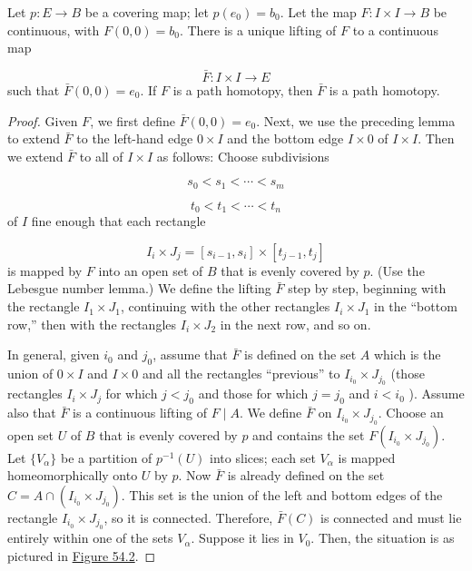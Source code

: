 \begin{lemma}
\label{lem:\thetheorem}
Let \(p : E \rightarrow B\) be a covering map; let \(p( e_{0}) = b_{0}\). Let the map \(F : I \times I \rightarrow B\) be continuous, with \(F( {0,0}) = b_{0}\). There is a unique lifting of \(F\) to a continuous map

\[
\bar{F} : I \times I \rightarrow E
\]
such that \(\bar{F}( {0,0}) = e_{0}\). If \(F\) is a path homotopy, then \(\bar{F}\) is a path homotopy.
\end{lemma}

\begin{proof}
Given \(F\), we first define \(\bar{F}( {0,0}) = e_{0}\). Next, we use the preceding lemma to extend \(\bar{F}\) to the left-hand edge \(0 \times I\) and the bottom edge \(I \times 0\) of \(I \times I\). Then we extend \(\bar{F}\) to all of \(I \times I\) as follows:
Choose subdivisions

\[
s_{0} < s_{1} < \cdots < s_{m}
\]

\[
t_{0} < t_{1} < \cdots < t_{n}
\]
of \(I\) fine enough that each rectangle

\[
I_{i} \times {J}_{j} = [ {s_{i - 1},s_{i}}] \times [ {t_{j - 1},t_{j}}]
\]
is mapped by \(F\) into an open set of \(B\) that is evenly covered by \(p\). (Use the Lebesgue number lemma.) We define the lifting \(\bar{F}\) step by step, beginning with the rectangle \(I_{1} \times {J}_{1}\), continuing with the other rectangles \(I_{i} \times {J}_{1}\) in the ``bottom row,'' then with the rectangles \(I_{i} \times {J}_{2}\) in the next row, and so on.

In general, given \(i_{0}\) and \(j_{0}\), assume that \(\bar{F}\) is defined on the set \(A\) which is the union of \(0 \times I\) and \(I \times 0\) and all the rectangles ``previous'' to \(I_{i_{0}} \times {J}_{j_{0}}\) (those rectangles \(I_{i} \times {J}_{j}\) for which \(j < j_{0}\) and those for which \(j = j_{0}\) and \(i < i_{0}\) ). Assume also that \(\bar{F}\) is a continuous lifting of \(F \mid A\). We define \(\bar{F}\) on \(I_{i_{0}} \times {J}_{j_{0}}\). Choose an open set \(U\) of \(B\) that is evenly covered by \(p\) and contains the set \(F( {I_{i_{0}} \times {J}_{j_{0}}})\). Let \(\{ V_{\alpha }\}\) be a partition of \(p^{-1}( U)\) into slices; each set \(V_{\alpha }\) is mapped homeomorphically onto \(U\) by \(p\). Now \(\bar{F}\) is already defined on the set \(C = A \cap ( {I_{i_{0}} \times {J}_{j_{0}}})\). This set is the union of the left and bottom edges of the rectangle \(I_{i_{0}} \times {J}_{j_{0}}\), so it is connected. Therefore, \(\bar{F}( C)\) is connected and must lie entirely within one of the sets \(V_{\alpha }\). Suppose it lies in \(V_{0}\). Then, the situation is as pictured in \hyperref[fig:54.2]{Figure 54.2}.


\end{proof}

